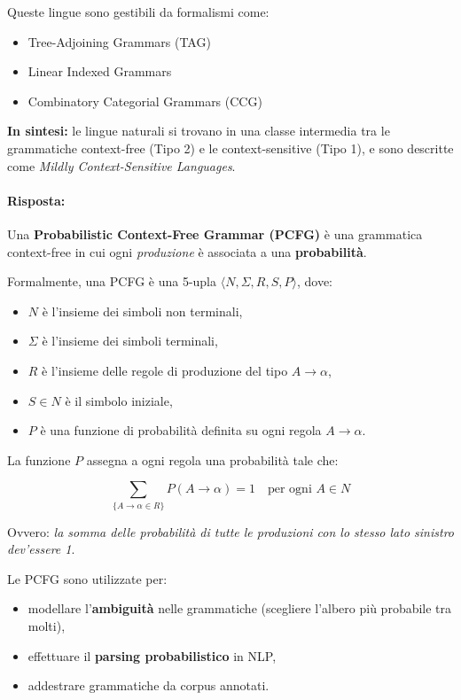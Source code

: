 \noindent
Queste lingue sono gestibili da formalismi come:
\begin{itemize}
    \item Tree-Adjoining Grammars (TAG)
    \item Linear Indexed Grammars
    \item Combinatory Categorial Grammars (CCG)
\end{itemize}

\medskip

\noindent
\textbf{In sintesi:} le lingue naturali si trovano in una classe intermedia tra le grammatiche context-free (Tipo 2) e le context-sensitive (Tipo 1), e sono descritte come \textit{Mildly Context-Sensitive Languages}.


\paragraph{Risposta:}
Una \textbf{Probabilistic Context-Free Grammar (PCFG)} è una grammatica context-free in cui ogni \textit{produzione} è associata a una \textbf{probabilità}.

\medskip
Formalmente, una PCFG è una 5-upla $\langle N, \Sigma, R, S, P \rangle$, dove:
\begin{itemize}
    \item $N$ è l'insieme dei simboli non terminali,
    \item $\Sigma$ è l'insieme dei simboli terminali,
    \item $R$ è l'insieme delle regole di produzione del tipo $A \rightarrow \alpha$,
    \item $S \in N$ è il simbolo iniziale,
    \item $P$ è una funzione di probabilità definita su ogni regola $A \rightarrow \alpha$.
\end{itemize}

\medskip
La funzione $P$ assegna a ogni regola una probabilità tale che:

\[
\sum_{\{A \rightarrow \alpha \in R\}} P(A \rightarrow \alpha) = 1 \quad \text{per ogni } A \in N
\]

Ovvero: \textit{la somma delle probabilità di tutte le produzioni con lo stesso lato sinistro dev'essere 1}.

\medskip
\noindent
Le PCFG sono utilizzate per:
\begin{itemize}
    \item modellare l'\textbf{ambiguità} nelle grammatiche (scegliere l'albero più probabile tra molti),
    \item effettuare il \textbf{parsing probabilistico} in NLP,
    \item addestrare grammatiche da corpus annotati.
\end{itemize}

